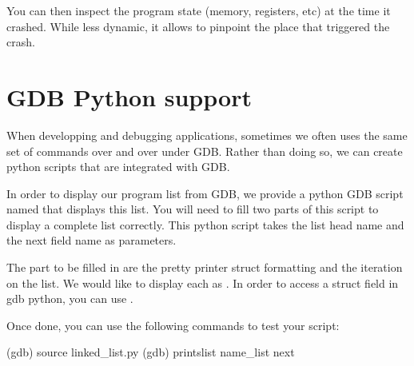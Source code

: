 
You can then inspect the program state (memory, registers, etc) at the time it
crashed. While less dynamic, it allows to pinpoint the place that triggered the 
crash.

\section{GDB Python support}

When developping and debugging applications, sometimes we often uses the same
set of commands over and over under GDB. Rather than doing so, we can create 
python scripts that are integrated with GDB.

In order to display our program list from GDB, we provide a python GDB script
named  that displays this list. You will need to fill two
parts of this script to display a complete list correctly. This python script
takes the list head name and the next field name as parameters.

The part to be filled in are the pretty printer struct formatting and the
iteration on the list. We would like to display each  as
. In order to access a struct field in gdb python, you can use
.

Once done, you can use the following commands to test your script:

\begin{bashinput}
(gdb) source linked_list.py
(gdb) printslist name_list next
\end{bashinput}
